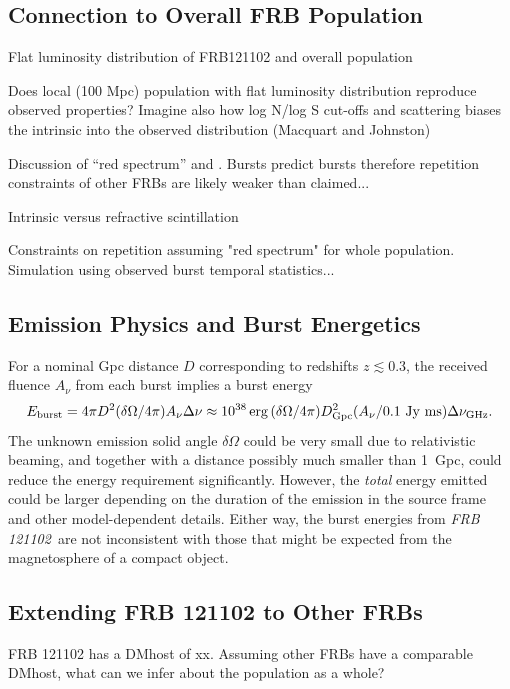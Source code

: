 \documentclass{emulateapj}
\newcommand{\frb}{\emph{FRB 121102}}
\begin{document}
\subsection{Connection to Overall FRB Population}

Flat luminosity distribution of FRB121102 and overall population

Does local (100 Mpc) population with flat luminosity distribution reproduce observed properties? Imagine also how log N/log S cut-offs and scattering biases the intrinsic into the observed distribution (Macquart and Johnston)

Discussion of ``red spectrum'' and \citet{2016MNRAS.458L..89C}. Bursts predict bursts therefore repetition constraints of other FRBs are likely weaker than claimed...

Intrinsic versus refractive scintillation

Constraints on repetition assuming "red spectrum" for whole population. Simulation using observed burst temporal statistics...


\subsection{Emission Physics and Burst Energetics}

For a nominal Gpc distance $D$ corresponding to redshifts $z\lesssim 0.3$, the received fluence $A_{\nu}$ from each burst implies  a burst energy
$$E_{\rm burst} = 4\pi D^2 (\delta\Omega/4\pi) A_{\nu} \Delta\nu
\approx 10^{38}\, {\rm erg}\,(\delta\Omega/4\pi) D_{\rm Gpc}^2  (A_{\nu} / 0.1\ {\rm Jy\ ms}) \Delta\nu_{\rm GHz}.$$
The unknown  emission solid angle $\delta\Omega$
could be very small due to relativistic beaming, and together with a distance possibly much smaller than 1~Gpc, could reduce the energy requirement significantly.  However, the {\it total} energy emitted could be larger depending on the duration of the emission in the source frame and other model-dependent details.
Either way, the burst energies from \frb\ are not inconsistent with those that might be expected from the magnetosphere of a compact object\cite{cw16}.

\subsection{Extending FRB 121102 to Other FRBs}

FRB 121102 has a DMhost of xx. Assuming other FRBs have a comparable DMhost, what can we infer about the population as a whole?
\end{document}
